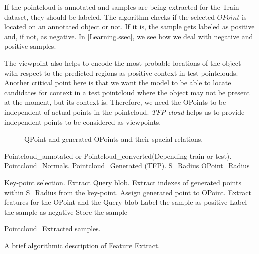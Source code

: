 If the pointcloud is annotated and samples are being extracted for the Train dataset, they should be labeled. The algorithm checks if the selected $OPoint$ is located on an annotated object or not. If it is, the sample gets labeled as positive and, if not, as negative. In \ref{Learning.ssec}, we see how we deal with negative and positive samples.

The viewpoint also helps to encode the most probable locations of the object with respect to the predicted regions as positive context in test pointclouds. Another critical point here is that we want the model to be able to locate candidates for context in a test pointcloud where the object may not be present at the moment, but its context is. Therefore, we need the OPoints to be independent of actual points in the pointcloud.
{\it TFP-cloud} helps us to provide independent points to be considered as viewpoints.




\begin{figure}[t]
  \caption[Feature extract structure]
  {QPoint and generated OPoints and their spacial relations.}
  \label{PointParameters_Diagram.figure}
\end{figure}

\begin{algorithm}[t]
\begin{algorithmic}[1]
\REQUIRE Pointcloud\_annotated or Pointcloud\_converted(Depending train or test).
\REQUIRE Pointcloud\_Normals.
\REQUIRE Pointcloud\_Generated (TFP).
\REQUIRE S\_Radius
\REQUIRE OPoint\_Radius
\medskip

\STATE Key-point selection.
  \STATE Extract Query blob.
  \STATE Extract indexes of generated points within S\_Radius from the key-point.
    \STATE Assign generated point to OPoint.
    \STATE Extract features for the OPoint and the Query blob
	\STATE Label the sample as positive
      \ELSE
	\STATE Label the sample as negative
      \ENDIF
     \ENDIF
   \ENDFOR
     \STATE Store the sample
\ENDFOR

\medskip
\ENSURE Pointcloud\_Extracted samples.
\end{algorithmic}
\caption[Feature Extract.]
{A brief algorithmic description of Feature Extract.}
\label{FeatureEXtract.algorithm}
\end{algorithm}




